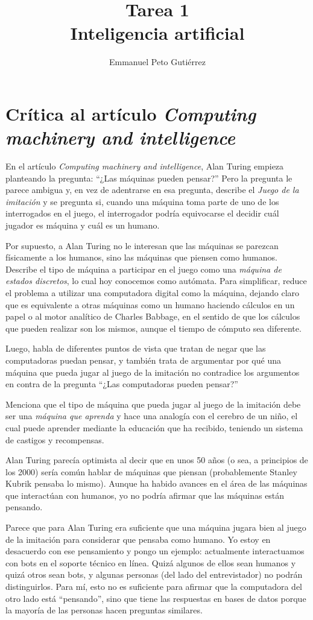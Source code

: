 \documentclass{article}
\title{Tarea 1\\Inteligencia artificial}
\author{Emmanuel Peto Gutiérrez}
\begin{document}
\maketitle

\section*{Crítica al artículo \textit{Computing machinery and intelligence}}

En el artículo \textit{Computing machinery and intelligence}, Alan Turing empieza planteando la pregunta: ``¿Las máquinas pueden pensar?'' Pero la pregunta le parece ambigua y, en vez de adentrarse en esa pregunta, describe el \textit{Juego de la imitación} y se pregunta si, cuando una máquina toma parte de uno de los interrogados en el juego, el interrogador podría equivocarse el decidir cuál jugador es máquina y cuál es un humano.

Por supuesto, a Alan Turing no le interesan que las máquinas se parezcan físicamente a los humanos, sino las máquinas que piensen como humanos. Describe el tipo de máquina a participar en el juego como una \textit{máquina de estados discretos}, lo cual hoy conocemos como autómata. Para simplificar, reduce el problema a utilizar una computadora digital como la máquina, dejando claro que es equivalente a otras máquinas como un humano haciendo cálculos en un papel o al motor analítico de Charles Babbage, en el sentido de que los cálculos que pueden realizar son los mismos, aunque el tiempo de cómputo sea diferente.

Luego, habla de diferentes puntos de vista que tratan de negar que las computadoras puedan pensar, y también trata de argumentar por qué una máquina que pueda jugar al juego de la imitación no contradice los argumentos en contra de la pregunta ``¿Las computadoras pueden pensar?''

Menciona que el tipo de máquina que pueda jugar al juego de la imitación debe ser una \textit{máquina que aprenda} y hace una analogía con el cerebro de un niño, el cual puede aprender mediante la educación que ha recibido, teniendo un sistema de castigos y recompensas.

Alan Turing parecía optimista al decir que en unos 50 años (o sea, a principios de los 2000) sería común hablar de máquinas que piensan (probablemente Stanley Kubrik pensaba lo mismo). Aunque ha habido avances en el área de las máquinas que interactúan con humanos, yo no podría afirmar que las máquinas están pensando.

Parece que para Alan Turing era suficiente que una máquina jugara bien al juego de la imitación para considerar que pensaba como humano. Yo estoy en desacuerdo con ese pensamiento y pongo un ejemplo: actualmente interactuamos con bots en el soporte técnico en línea. Quizá algunos de ellos sean humanos y quizá otros sean bots, y algunas personas (del lado del entrevistador) no podrán distinguirlos. Para mí, esto no es suficiente para afirmar que la computadora del otro lado está ``pensando'', sino que tiene las respuestas en bases de datos porque la mayoría de las personas hacen preguntas similares.
\end{document}
